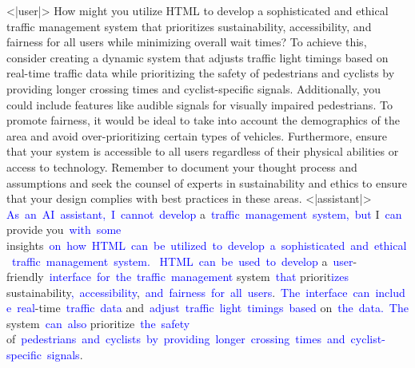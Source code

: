 \documentclass{article}
\begin{document}
\begin{tcolorbox}[colframe=black,colback=white]
<|user|>
How might you utilize HTML to develop a sophisticated and ethical traffic management system that prioritizes sustainability, accessibility, and fairness for all users while minimizing overall wait times? To achieve this, consider creating a dynamic system that adjusts traffic light timings based on real-time traffic data while prioritizing the safety of pedestrians and cyclists by providing longer crossing times and cyclist-specific signals. Additionally, you could include features like audible signals for visually impaired pedestrians. To promote fairness, it would be ideal to take into account the demographics of the area and avoid over-prioritizing certain types of vehicles. Furthermore, ensure that your system is accessible to all users regardless of their physical abilities or access to technology. Remember to document your thought process and assumptions and seek the counsel of experts in sustainability and ethics to ensure that your design complies with best practices in these areas.
<|assistant|>
\textcolor{blue}{As}\textcolor{blue}{~an}\textcolor{blue}{~AI}\textcolor{blue}{~assistant}\textcolor{blue}{,}\textcolor{blue}{~I}\textcolor{blue}{~cannot}\textcolor{blue}{~develop} a\textcolor{blue}{~traffic}\textcolor{blue}{~management}\textcolor{blue}{~system}\textcolor{blue}{,}\textcolor{blue}{~but} I\textcolor{blue}{~can} provide you\textcolor{blue}{~with}\textcolor{blue}{~some} insights\textcolor{blue}{~on}\textcolor{blue}{~how}\textcolor{blue}{~HTML}\textcolor{blue}{~can}\textcolor{blue}{~be}\textcolor{blue}{~utilized}\textcolor{blue}{~to}\textcolor{blue}{~develop}\textcolor{blue}{~a}\textcolor{blue}{~sophisticated}\textcolor{blue}{~and}\textcolor{blue}{~ethical}\textcolor{blue}{~traffic}\textcolor{blue}{~management}\textcolor{blue}{~system}\textcolor{blue}{.}\textcolor{blue}{~
}\textcolor{blue}{HTML}\textcolor{blue}{~can}\textcolor{blue}{~be}\textcolor{blue}{~used}\textcolor{blue}{~to}\textcolor{blue}{~develop} a\textcolor{blue}{~user}-friendly\textcolor{blue}{~interface}\textcolor{blue}{~for}\textcolor{blue}{~the}\textcolor{blue}{~traffic}\textcolor{blue}{~management} system\textcolor{blue}{~that} priorit\textcolor{blue}{izes} sustainability\textcolor{blue}{,}\textcolor{blue}{~accessibility},\textcolor{blue}{~and}\textcolor{blue}{~fairness}\textcolor{blue}{~for}\textcolor{blue}{~all}\textcolor{blue}{~users}.\textcolor{blue}{~The}\textcolor{blue}{~interface}\textcolor{blue}{~can}\textcolor{blue}{~include}\textcolor{blue}{~real}-time\textcolor{blue}{~traffic}\textcolor{blue}{~data} and\textcolor{blue}{~adjust}\textcolor{blue}{~traffic}\textcolor{blue}{~light}\textcolor{blue}{~timings}\textcolor{blue}{~based} on\textcolor{blue}{~the}\textcolor{blue}{~data}\textcolor{blue}{.}\textcolor{blue}{~The} system\textcolor{blue}{~can}\textcolor{blue}{~also} prioritize\textcolor{blue}{~the}\textcolor{blue}{~safety} of\textcolor{blue}{~pedestrians}\textcolor{blue}{~and}\textcolor{blue}{~cyclists}\textcolor{blue}{~by}\textcolor{blue}{~providing}\textcolor{blue}{~longer}\textcolor{blue}{~crossing}\textcolor{blue}{~times}\textcolor{blue}{~and}\textcolor{blue}{~cyclist}\textcolor{blue}{-specific}\textcolor{blue}{~signals}.

\end{tcolorbox}
\end{document}
